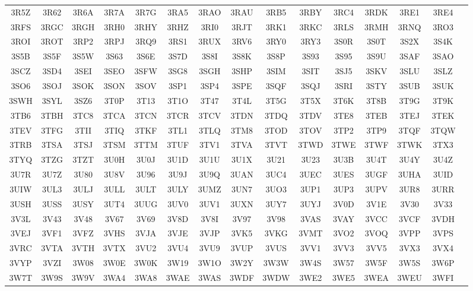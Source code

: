 \begin{longtable}{ c c c c c c c c c c c c c c c }
	3R5Z & 3R62 & 3R6A & 3R7A & 3R7G & 3RA5 & 3RAO & 3RAU & 3RB5 & 3RBY & 3RC4 & 3RDK & 3RE1 & 3RE4  \\
	3RFS & 3RGC & 3RGH & 3RH0 & 3RHY & 3RHZ & 3RI0 & 3RJT & 3RK1 & 3RKC & 3RLS & 3RMH & 3RNQ & 3RO3  \\
	3ROI & 3ROT & 3RP2 & 3RPJ & 3RQ9 & 3RS1 & 3RUX & 3RV6 & 3RY0 & 3RY3 & 3S0R & 3S0T & 3S2X & 3S4K  \\
	3S5B & 3S5F & 3S5W & 3S63 & 3S6E & 3S7D & 3S8I & 3S8K & 3S8P & 3S93 & 3S95 & 3S9U & 3SAF & 3SAO  \\
	3SCZ & 3SD4 & 3SEI & 3SEO & 3SFW & 3SG8 & 3SGH & 3SHP & 3SIM & 3SIT & 3SJ5 & 3SKV & 3SLU & 3SLZ  \\
	3SO6 & 3SOJ & 3SOK & 3SON & 3SOV & 3SP1 & 3SP4 & 3SPE & 3SQF & 3SQJ & 3SRI & 3STY & 3SUB & 3SUK  \\
	3SWH & 3SYL & 3SZ6 & 3T0P & 3T13 & 3T1O & 3T47 & 3T4L & 3T5G & 3T5X & 3T6K & 3T8B & 3T9G & 3T9K  \\
	3TB6 & 3TBH & 3TC8 & 3TCA & 3TCN & 3TCR & 3TCV & 3TDN & 3TDQ & 3TDV & 3TE8 & 3TEB & 3TEJ & 3TEK  \\
	3TEV & 3TFG & 3TII & 3TIQ & 3TKF & 3TL1 & 3TLQ & 3TM8 & 3TOD & 3TOV & 3TP2 & 3TP9 & 3TQF & 3TQW  \\
	3TRB & 3TSA & 3TSJ & 3TSM & 3TTM & 3TUF & 3TV1 & 3TVA & 3TVT & 3TWD & 3TWE & 3TWF & 3TWK & 3TX3  \\
	3TYQ & 3TZG & 3TZT & 3U0H & 3U0J & 3U1D & 3U1U & 3U1X & 3U21 & 3U23 & 3U3B & 3U4T & 3U4Y & 3U4Z  \\
	3U7R & 3U7Z & 3U80 & 3U8V & 3U96 & 3U9J & 3U9Q & 3UAN & 3UC4 & 3UEC & 3UES & 3UGF & 3UHA & 3UID  \\
	3UIW & 3UL3 & 3ULJ & 3ULL & 3ULT & 3ULY & 3UMZ & 3UN7 & 3UO3 & 3UP1 & 3UP3 & 3UPV & 3UR8 & 3URR  \\
	3USH & 3USS & 3USY & 3UT4 & 3UUG & 3UV0 & 3UV1 & 3UXN & 3UY7 & 3UYJ & 3V0D & 3V1E & 3V30 & 3V33  \\
	3V3L & 3V43 & 3V48 & 3V67 & 3V69 & 3V8D & 3V8I & 3V97 & 3V98 & 3VAS & 3VAY & 3VCC & 3VCF & 3VDH  \\
	3VEJ & 3VF1 & 3VFZ & 3VHS & 3VJA & 3VJE & 3VJP & 3VK5 & 3VKG & 3VMT & 3VO2 & 3VOQ & 3VPP & 3VPS  \\
	3VRC & 3VTA & 3VTH & 3VTX & 3VU2 & 3VU4 & 3VU9 & 3VUP & 3VUS & 3VV1 & 3VV3 & 3VV5 & 3VX3 & 3VX4  \\
	3VYP & 3VZI & 3W08 & 3W0E & 3W0K & 3W19 & 3W1O & 3W2Y & 3W3W & 3W4S & 3W57 & 3W5F & 3W5S & 3W6P  \\
	3W7T & 3W9S & 3W9V & 3WA4 & 3WA8 & 3WAE & 3WAS & 3WDF & 3WDW & 3WE2 & 3WE5 & 3WEA & 3WEU & 3WFI  \\

\end{longtable}
